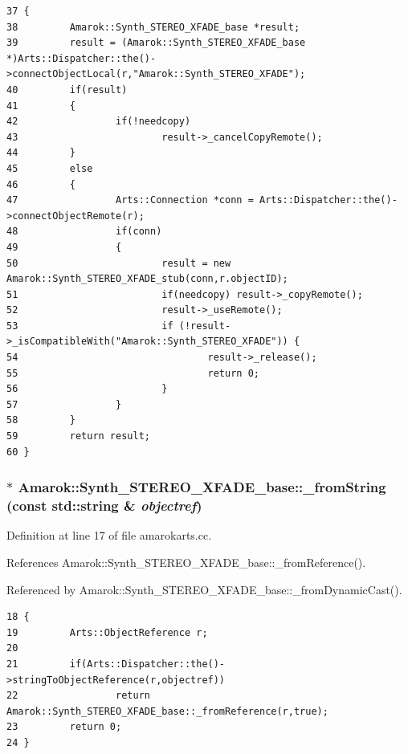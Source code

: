 \footnotesize\begin{verbatim}37 {
38         Amarok::Synth_STEREO_XFADE_base *result;
39         result = (Amarok::Synth_STEREO_XFADE_base *)Arts::Dispatcher::the()->connectObjectLocal(r,"Amarok::Synth_STEREO_XFADE");
40         if(result)
41         {
42                 if(!needcopy)
43                         result->_cancelCopyRemote();
44         }
45         else
46         {
47                 Arts::Connection *conn = Arts::Dispatcher::the()->connectObjectRemote(r);
48                 if(conn)
49                 {
50                         result = new Amarok::Synth_STEREO_XFADE_stub(conn,r.objectID);
51                         if(needcopy) result->_copyRemote();
52                         result->_useRemote();
53                         if (!result->_isCompatibleWith("Amarok::Synth_STEREO_XFADE")) {
54                                 result->_release();
55                                 return 0;
56                         }
57                 }
58         }
59         return result;
60 }
\end{verbatim}\normalsize 
{}
\subsubsection{ $\ast$ Amarok::Synth\_\-STEREO\_\-XFADE\_\-base::\_\-from\-String (const std::string \& {\em objectref})\hspace{0.3cm}{\tt  [static, inherited]}}\label{classAmarok_1_1Synth__STEREO__XFADE__base_Amarok_1_1Synth__STEREO__XFADE__stube1}




Definition at line 17 of file amarokarts.cc.

References Amarok::Synth\_\-STEREO\_\-XFADE\_\-base::\_\-from\-Reference().

Referenced by Amarok::Synth\_\-STEREO\_\-XFADE\_\-base::\_\-from\-Dynamic\-Cast().



\footnotesize\begin{verbatim}18 {
19         Arts::ObjectReference r;
20 
21         if(Arts::Dispatcher::the()->stringToObjectReference(r,objectref))
22                 return Amarok::Synth_STEREO_XFADE_base::_fromReference(r,true);
23         return 0;
24 }
\end{verbatim}\normalsize 


